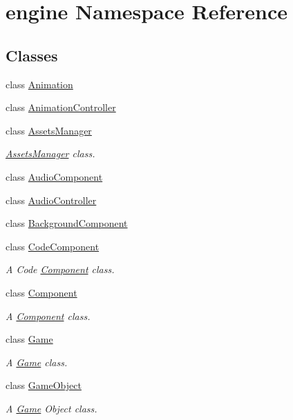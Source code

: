 \hypertarget{namespaceengine}{}\section{engine Namespace Reference}
\label{namespaceengine}
\subsection*{Classes}
\begin{DoxyCompactItemize}
\item 
class \hyperlink{classengine_1_1_animation}{Animation}
\item 
class \hyperlink{classengine_1_1_animation_controller}{Animation\+Controller}
\item 
class \hyperlink{classengine_1_1_assets_manager}{Assets\+Manager}
\begin{DoxyCompactList}\small\item\em \hyperlink{classengine_1_1_assets_manager}{Assets\+Manager} class. \end{DoxyCompactList}\item 
class \hyperlink{classengine_1_1_audio_component}{Audio\+Component}
\item 
class \hyperlink{classengine_1_1_audio_controller}{Audio\+Controller}
\item 
class \hyperlink{classengine_1_1_background_component}{Background\+Component}
\item 
class \hyperlink{classengine_1_1_code_component}{Code\+Component}
\begin{DoxyCompactList}\small\item\em A Code \hyperlink{classengine_1_1_component}{Component} class. \end{DoxyCompactList}\item 
class \hyperlink{classengine_1_1_component}{Component}
\begin{DoxyCompactList}\small\item\em A \hyperlink{classengine_1_1_component}{Component} class. \end{DoxyCompactList}\item 
class \hyperlink{classengine_1_1_game}{Game}
\begin{DoxyCompactList}\small\item\em A \hyperlink{classengine_1_1_game}{Game} class. \end{DoxyCompactList}\item 
class \hyperlink{classengine_1_1_game_object}{Game\+Object}
\begin{DoxyCompactList}\small\item\em A \hyperlink{classengine_1_1_game}{Game} Object class. \end{DoxyCompactList}\item 

\end{DoxyCompactItemize}
